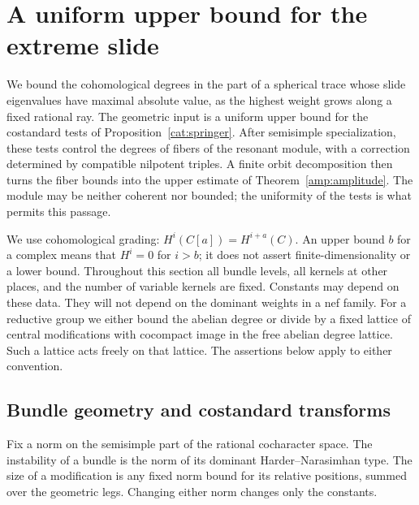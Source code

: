 \section{A uniform upper bound for the extreme slide}
\label{sec:amplitude}

We bound the cohomological degrees in the part of a spherical trace
whose slide eigenvalues have maximal absolute value, as the highest
weight grows along a fixed rational ray. The geometric input is a
uniform upper bound for the costandard tests of
Proposition~\ref{cat:springer}. After semisimple specialization, these
tests control the degrees of fibers of the resonant module, with a
correction determined by compatible nilpotent triples. A finite orbit
decomposition then turns the fiber bounds into the upper estimate of
Theorem~\ref{amp:amplitude}. The module may be neither coherent nor
bounded; the uniformity of the tests is what permits this passage.

We use cohomological grading: $H^i(C[a])=H^{i+a}(C)$.
An upper bound $b$ for a complex means that $H^i=0$ for $i>b$;
it does not assert finite-dimensionality or a lower bound.
Throughout this section all bundle levels, all kernels at other places,
and the number of variable kernels are fixed.  Constants may depend on
these data.  They will not depend on the dominant weights in a nef family.
For a reductive group we either bound the abelian degree or divide by a
fixed lattice of central modifications with cocompact image in the free
abelian degree lattice.  Such a lattice acts freely on that lattice.
The assertions below apply to either convention.

\subsection{Bundle geometry and costandard transforms}

Fix a norm on the semisimple part of the rational cocharacter space.
The instability of a bundle is the norm of its dominant
Harder--Narasimhan type.  The size of a modification is any fixed norm
bound for its relative positions, summed over the geometric legs.
Changing either norm changes only the constants.

